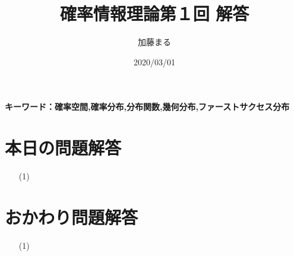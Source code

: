 \documentclass[a4j,uplatex]{jsarticle}
\title{確率情報理論第１回 解答}
\author{加藤まる}
\date{2020/03/01}
\begin{document}
\maketitle
\bf キーワード：確率空間,確率分布,分布関数,幾何分布,ファーストサクセス分布

\section*{本日の問題解答}
\begin{itemize}
  \item[(1)]
\end{itemize}

\section*{おかわり問題解答}
\begin{itemize}
  \item[(1)]
\end{itemize}
\end{document}
